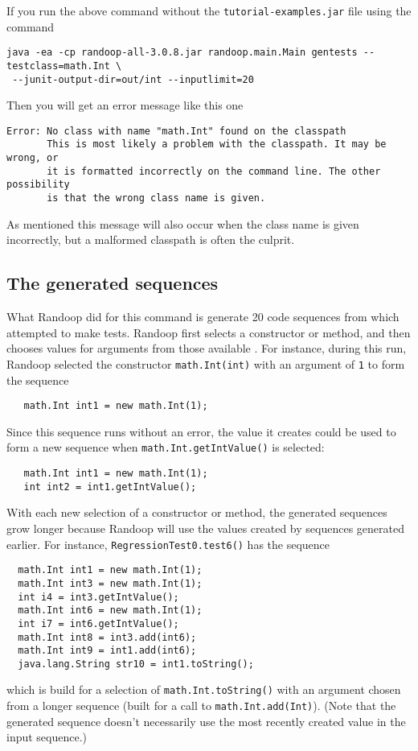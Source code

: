 \documentclass[11pt, oneside]{article} %
\newcommand{\code}[1]{{\texttt{#1}}}
\begin{document}
If you run the above command without the \texttt{tutorial-examples.jar} file using the command
\begin{verbatim}
java -ea -cp randoop-all-3.0.8.jar randoop.main.Main gentests --testclass=math.Int \
 --junit-output-dir=out/int --inputlimit=20
\end{verbatim}
Then you will get an error message like this one
\begin{verbatim}
Error: No class with name "math.Int" found on the classpath
       This is most likely a problem with the classpath. It may be wrong, or
       it is formatted incorrectly on the command line. The other possibility
       is that the wrong class name is given.
\end{verbatim}
As mentioned this message will also occur when the class name is given incorrectly, but a malformed classpath is often the culprit.


\subsection{The generated sequences}
What Randoop did for this command is generate 20 code sequences from which attempted to make tests. 
Randoop first selects a constructor or method, and then chooses values for arguments from those available .
For instance, during this run, Randoop selected the constructor \code{math.Int(int)} with an argument of \code{1} to form the sequence
\begin{verbatim}
   math.Int int1 = new math.Int(1);
\end{verbatim}
Since this sequence runs without an error, the value it creates could be used to form a new sequence when \code{math.Int.getIntValue()} is selected:
\begin{verbatim}
   math.Int int1 = new math.Int(1);
   int int2 = int1.getIntValue();
\end{verbatim}
With each new selection of a constructor or method, the generated sequences grow longer because Randoop will use the values created by sequences generated earlier. 
For instance, \code{RegressionTest0.test6()} has the sequence
\begin{verbatim}
  math.Int int1 = new math.Int(1);
  math.Int int3 = new math.Int(1);
  int i4 = int3.getIntValue();
  math.Int int6 = new math.Int(1);
  int i7 = int6.getIntValue();
  math.Int int8 = int3.add(int6);
  math.Int int9 = int1.add(int6);
  java.lang.String str10 = int1.toString();
\end{verbatim}
which is build for a selection of \code{math.Int.toString()} with an argument chosen from a longer sequence (built for a call to \code{math.Int.add(Int)}).
(Note that the generated sequence doesn't necessarily use the most recently created value in the input sequence.)
\end{document}
